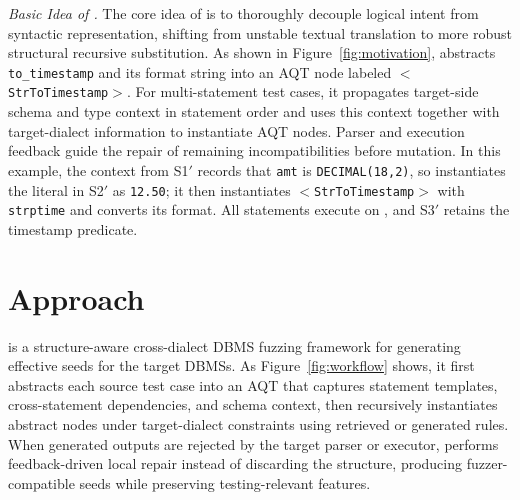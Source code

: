 \documentclass[conference]{IEEEtran}
\begin{document}
\textit{Basic Idea of \tool{}.}
The core idea of \tool{} is to thoroughly decouple logical intent from syntactic representation, shifting from unstable textual translation to more robust structural recursive substitution. 
As shown in Figure~\ref{fig:motivation}, \tool{} abstracts \texttt{to\_timestamp} and its format string into an AQT node labeled $<$\texttt{StrToTimestamp}$>$.
For multi-statement test cases, it propagates target-side schema and type context in statement order and uses this context together with target-dialect information to instantiate AQT nodes.
Parser and execution feedback guide the repair of remaining incompatibilities before mutation.
In this example, the context from S1$'$ records that \texttt{amt} is \texttt{DECIMAL(18,2)}, so \tool{} instantiates the literal in S2$'$ as \texttt{12.50}; it then instantiates $<$\texttt{StrToTimestamp}$>$ with \texttt{strptime} and converts its format. All statements execute on \duckdb{}, and S3$'$ retains the timestamp predicate.
\section{Approach}
\label{sec:approach}

\tool{} is a structure-aware cross-dialect DBMS fuzzing framework for generating effective seeds for the target DBMSs.
As Figure~\ref{fig:workflow} shows, 
it first abstracts each source test case into an AQT that captures statement templates, cross-statement dependencies, and schema context, then recursively instantiates abstract nodes under target-dialect constraints using retrieved or generated rules.
When generated outputs are rejected by the target parser or executor, \tool{} performs feedback-driven local repair instead of discarding the structure, producing fuzzer-compatible seeds while preserving testing-relevant features.
\end{document}
